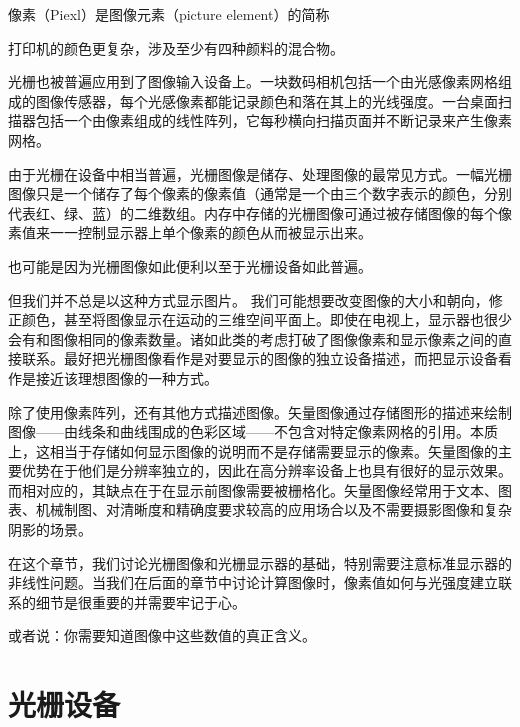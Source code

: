 \documentclass[lang=cn,12pt]{elegantbook}
\begin{document}
\begin{note}
像素（Piexl）是图像元素（picture element）的简称
\end{note}

\begin{note}
打印机的颜色更复杂，涉及至少有四种颜料的混合物。
\end{note}

光栅也被普遍应用到了图像输入设备上。一块数码相机包括一个由光感像素网格组成的图像传感器，每个光感像素都能记录颜色和落在其上的光线强度。一台桌面扫描器包括一个由像素组成的线性阵列，它每秒横向扫描页面并不断记录来产生像素网格。

由于光栅在设备中相当普遍，光栅图像是储存、处理图像的最常见方式。一幅光栅图像只是一个储存了每个像素的像素值（通常是一个由三个数字表示的颜色，分别代表红、绿、蓝）的二维数组。内存中存储的光栅图像可通过被存储图像的每个像素值来一一控制显示器上单个像素的颜色从而被显示出来。

\begin{note}
也可能是因为光栅图像如此便利以至于光栅设备如此普遍。
\end{note}

但我们并不总是以这种方式显示图片。 我们可能想要改变图像的大小和朝向，修正颜色，甚至将图像显示在运动的三维空间平面上。即使在电视上，显示器也很少会有和图像相同的像素数量。诸如此类的考虑打破了图像像素和显示像素之间的直接联系。最好把光栅图像看作是对要显示的图像的独立设备描述，而把显示设备看作是接近该理想图像的一种方式。

除了使用像素阵列，还有其他方式描述图像。矢量图像通过存储图形的描述来绘制图像——由线条和曲线围成的色彩区域——不包含对特定像素网格的引用。本质上，这相当于存储如何显示图像的说明而不是存储需要显示的像素。矢量图像的主要优势在于他们是分辨率独立的，因此在高分辨率设备上也具有很好的显示效果。而相对应的，其缺点在于在显示前图像需要被栅格化。矢量图像经常用于文本、图表、机械制图、对清晰度和精确度要求较高的应用场合以及不需要摄影图像和复杂阴影的场景。

在这个章节，我们讨论光栅图像和光栅显示器的基础，特别需要注意标准显示器的非线性问题。当我们在后面的章节中讨论计算图像时，像素值如何与光强度建立联系的细节是很重要的并需要牢记于心。

\begin{note}
或者说：你需要知道图像中这些数值的真正含义。
\end{note}

\section{光栅设备}
\end{document}

